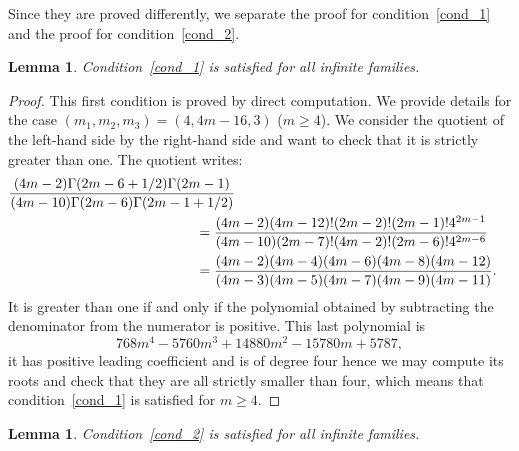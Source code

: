 \documentclass[10pt]{amsart}
\theoremstyle{plain}
\newtheorem{lem}[thm]{Lemma}
\theoremstyle{definition}
\begin{document}
Since they are proved differently, we separate the proof for condition~\eqref{cond_1}
and the proof for condition~\eqref{cond_2}.

\begin{lem}
Condition~\eqref{cond_1} is satisfied for all infinite families.
\end{lem}

\begin{proof}
This first condition is proved by direct computation.
We provide details for the case $(m_1,m_2,m_3)=(4,4m-16,3)$ ($m\geq 4$).
We consider the quotient of the left-hand side by the right-hand side and want to check that it is
strictly greater than one. The quotient writes:
\begin{align*}
 \frac{(4m-2)\Gamma(2m-6+1/2)\Gamma(2m-1)}{(4m-10)\Gamma(2m-6)\Gamma(2m-1+1/2)}\\
&\hspace*{-1cm} =\frac{(4m-2)(4m-12)!(2m-2)!(2m-1)!4^{2m-1}}{(4m-10)(2m-7)!(4m-2)!(2m-6)!4^{2m-6}} \\
&\hspace*{-1cm} = \frac{(4m-2)(4m-4)(4m-6)(4m-8)(4m-12)}{(4m-3)(4m-5)(4m-7)(4m-9)(4m-11)}.
\end{align*}
It is greater than one if and only if the polynomial obtained by subtracting the
denominator from the numerator is positive. This last polynomial is
\begin{equation*}
768 m^4 - 5760 m^3 + 14880 m^2 - 15780 m + 5787,
\end{equation*}
it has positive leading coefficient and is of degree four
hence we may compute its roots and check
that they are all strictly smaller than four, which means that condition~\eqref{cond_1}
is satisfied for $m\geq 4$.
\end{proof}

\begin{lem}
Condition~\eqref{cond_2} is satisfied for all infinite families.
\end{lem}
\end{document}
